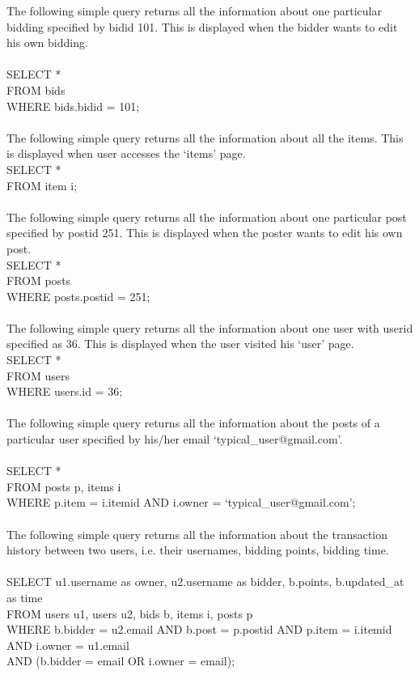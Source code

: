 The following simple query returns all the information about one particular bidding specified by bidid 101. This is displayed when the bidder wants to edit his own bidding.\\
\\
SELECT * \\
FROM bids\\
WHERE bids.bidid = 101;\\\\
The following simple query returns all the information about all the items. This is displayed when user accesses the `items' page.\\
SELECT * \\
FROM item i;\\\\
The following simple query returns all the information about one particular post specified by postid 251. This is displayed when the poster wants to edit his own post.\\
SELECT * \\
FROM posts \\
WHERE posts.postid = 251;\\\\
The following simple query returns all the information about one user with userid specified as 36. This is displayed when the user visited his `user' page.\\
SELECT * \\
FROM users \\
WHERE users.id = 36;\\\\
The following simple query returns all the information about the posts of a particular user specified by his/her email `typical\_user@gmail.com'.\\\\
SELECT * \\
FROM posts p, items i \\
WHERE p.item = i.itemid AND i.owner = `typical\_user@gmail.com';\\\\
The following simple query returns all the information about the transaction history between two users, i.e. their usernames, bidding points, bidding time.\\\\
SELECT u1.username as owner, u2.username as bidder, b.points, b.updated\_at as time\\
FROM users u1, users u2, bids b, items i, posts p\\
WHERE b.bidder = u2.email AND b.post = p.postid AND p.item = i.itemid AND i.owner = u1.email\\
AND (b.bidder = email OR i.owner = email);

